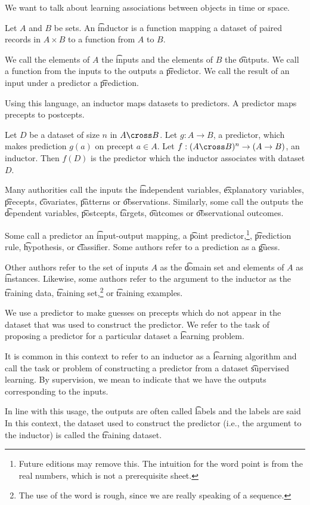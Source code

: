 

We want to talk about learning associations between objects in time or space.


Let $A$ and $B$ be sets.
An \t{inductor} is a function mapping a dataset of paired records in $A \times B$ to a function from $A$ to $B$.

We call the elements of $A$ the \t{inputs} and the elements of $B$ the \t{outputs}.
We call a function from the inputs to the outputs a \t{predictor}.
We call the result of an input under a predictor a \t{prediction}.

Using this language, an inductor maps datasets to predictors.
A predictor maps precepts to postcepts.


Let $D$ be a dataset of size $n$ in $A \cross B$.
Let $g: A \to B$, a predictor, which makes prediction $g(a)$ on precept $a \in A$.
Let $f: (A \cross B)^n \to (A \to B)$, an inductor.
Then $f(D)$ is the predictor which the inductor associates with dataset $D$.


Many authorities call the inputs the \t{independent variables}, \t{explanatory variables}, \t{precepts}, \t{covariates}, \t{patterns} or \t{observations}.
Similarly, some call the outputs the \t{dependent variables}, \t{postcepts}, \t{targets}, \t{outcomes} or \t{observational outcomes}.

Some call a predictor an \t{input-output} mapping, a \t{point predictor},\footnote{Future editions may remove this. The intuition for the word point is from the real numbers, which is not a prerequisite sheet.}, \t{prediction rule}, \t{hypothesis}, or \t{classifier}.
Some authors refer to a prediction as a \t{guess}.

Other authors refer to the set of inputs $A$ as the \t{domain set} and elements of $A$ as \t{instances}.
Likewise, some authors refer to the argument to the inductor as the \t{training data}, \t{training set},\footnote{The use of the word  is rough, since we are really speaking of a sequence.} or \t{training examples}.


We use a predictor to make guesses on precepts which do not appear in the dataset that was used to construct the predictor.
We refer to the task of proposing a predictor for a particular dataset a \t{learning problem}.

It is common in this context to refer to an inductor as a \t{learning algorithm} and call the task or problem of constructing a predictor from a dataset  \t{supervised learning}.
By supervision, we mean to indicate that we have the outputs corresponding to the inputs.

In line with this usage, the outputs are often called \t{labels} and the labels are said 
In this context, the dataset used to construct the predictor (i.e., the argument to the inductor) is called the \t{training dataset}.